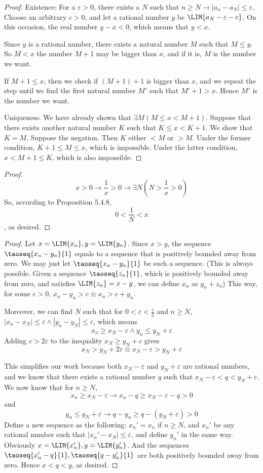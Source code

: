 \begin{proof}
Existence:
For a $\varepsilon>0$, there exists a $N$ such that $n\geq N \longrightarrow |a_n-a_N| \leq \varepsilon$. Choose an 
arbitrary $c>0$, and let a rational number $y$ be $\LIM{a_N-\varepsilon-c}$. On this occasion, the real number 
$y-x<0$, which means that $y<x$. 

Since $y$ is a rational number, there exists a natural number $M$ such that $M \leq y$. So $M<x$ the number $M+1$ may be 
bigger than $x$, and if it is, $M$ is the number we want.

If $M+1 \leq x$, then we check if $(M+1)+1$ is bigger than $x$, and we repeat the step until we find the first natural 
number $M'$ such that $M'+1>x$. Hence $M'$ is the number we want.

Uniqueness:
We have already shown that $\exists M(M\leq x<M+1)$.
Suppose that there exists another natural number $K$ such that $K\leq x<K+1$. We show that $K=M$. Suppose the negation. 
Then $K$ either $<M$ or $>M$. Under the former condition, $K+1\leq M\leq x$, which is impossible. Under the latter 
condition, $x<M+1\leq K$, which is also impossible.
\end{proof}

\begin{proof}
\[
x>0\rightarrow \frac{1}{x}>0\rightarrow \exists N(N>\frac{1}{x}>0)
\]
So, according to Proposition 5.4.8,
\[
0<\frac{1}{N}<x
\]
, as desired.
\end{proof}

\begin{proof}
Let $x=\LIM{x_n},y=\LIM{y_n}$. Since $x>y$, the sequence $\taoseq{x_n-y_n}{1}$ equals to a sequence that is positively 
bounded 
away from zero. We may just let $\taoseq{x_n-y_n}{1}$ be such a sequence. (This is always possible. Given a sequence 
$\taoseq{z_n}{1}$, which is positively bounded away from zero, and satisfies $\LIM{z_n}=x-y$, we can define $x_n$ as 
$y_n+z_n$) This way, for some $c>0$, $x_n-y_n>c\equiv x_n>c+y_n$. 

Moreover, we can find $N$ such that for $0<\varepsilon<\frac{c}{2}$ and $n\geq N$, 
$|x_n-x_N|\leq \varepsilon\wedge|y_n-y_N|\leq \varepsilon$, which means
\[
x_n\geq x_N -\varepsilon\wedge y_n \leq y_N+\varepsilon
\]
Adding $c>2\varepsilon$ to the inequality $x_N \geq y_N+c$ gives
\[
x_N>y_N+2\varepsilon \equiv x_N-\varepsilon>y_N+\varepsilon
\]

This simplifies our work because both $x_N-\varepsilon$ and $y_N+\varepsilon$ are rational numbers, and we know that 
there exists a rational number $q$ such that $x_N-\varepsilon<q<y_N+\varepsilon$. We now know that for $n\geq N$,
\[
x_n \geq x_N -\varepsilon \longrightarrow x_n-q \geq x_N-\varepsilon-q>0
\]
and
\[
y_n \leq y_N +\varepsilon \longrightarrow q-y_n \geq q-(y_N+\varepsilon)>0
\]
Define a new sequence as the following: $x_n'=x_n$ if $n\geq N$, and $x_n'$ be any rational number such that $
|x_n'-x_N|\leq \varepsilon$, and define $y_n'$ in the same way. Obviously $x=\LIM{x_n'},y=\LIM{y_n'}$. And the sequences
$\taoseq{x_n'-q}{1},\taoseq{q-y_n'}{1}$ are both positively bounded away from zero. Hence $x<q<y$, as desired.
\end{proof}

